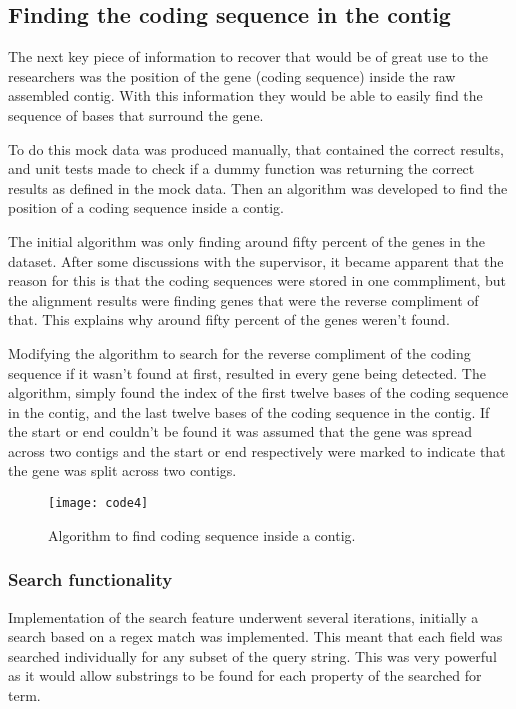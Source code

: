 \subsection{Finding the coding sequence in the contig}
The next key piece of information to recover that would be of great use to the researchers was the position of the gene (coding sequence) inside the raw assembled contig. With this information they would be able to easily find the sequence of bases that surround the gene.

To do this mock data was produced manually, that contained the correct results, and unit tests made to check if a dummy function was returning the correct results as defined in the mock data. Then an algorithm was developed to find the position of a coding sequence inside a contig. 

The initial algorithm was only finding around fifty percent of the genes in the dataset. After some discussions with the supervisor, it became apparent that the reason for this is that the coding sequences were stored in one commpliment, but the alignment results were finding genes that were the reverse compliment of that. This explains why around fifty percent of the genes weren't found. 

Modifying the algorithm to search for the reverse compliment of the coding sequence if it wasn't found at first, resulted in every gene being detected. The algorithm, simply found the index of the first twelve bases of the coding sequence in the contig, and the last twelve bases of the coding sequence in the contig. If the start or end couldn't be found it was assumed that the gene was spread across two contigs and the start or end respectively were marked to indicate that the gene was split across two contigs. 

\begin{figure}[H]
\begin{center}
\texttt{[image: code4]}
\caption{Algorithm to find coding sequence inside a contig. \label{overflow}}
\end{center}
\end{figure}

\subsubsection{Search functionality}
Implementation of the search feature underwent several iterations, initially a search based on a regex match was implemented. This meant that each field was searched individually for any subset of the query string. This was very powerful as it would allow substrings to be found for each property of the searched for term. 

